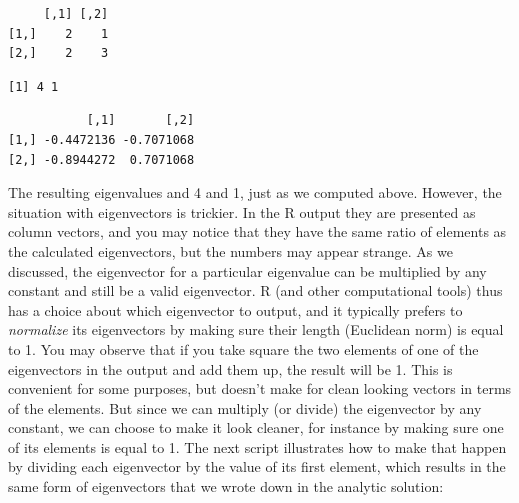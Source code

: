 \documentclass[
  letterpaper,
  DIV=11,
  numbers=noendperiod]{scrreprt}
\newenvironment{Shaded}{\begin{snugshade}}{\end{snugshade}}
\newcommand{\FunctionTok}[1]{\textcolor[rgb]{0.28,0.35,0.67}{#1}}
\newcommand{\NormalTok}[1]{\textcolor[rgb]{0.00,0.23,0.31}{#1}}
\newcommand{\OtherTok}[1]{\textcolor[rgb]{0.00,0.23,0.31}{#1}}
\newcommand{\SpecialCharTok}[1]{\textcolor[rgb]{0.37,0.37,0.37}{#1}}
\begin{document}
\begin{verbatim}
     [,1] [,2]
[1,]    2    1
[2,]    2    3
\end{verbatim}

\begin{Shaded}
\end{Shaded}

\begin{verbatim}
[1] 4 1
\end{verbatim}

\begin{Shaded}
\end{Shaded}

\begin{verbatim}
           [,1]       [,2]
[1,] -0.4472136 -0.7071068
[2,] -0.8944272  0.7071068
\end{verbatim}

The resulting eigenvalues and 4 and 1, just as we computed above.
However, the situation with eigenvectors is trickier. In the R output
they are presented as column vectors, and you may notice that they have
the same ratio of elements as the calculated eigenvectors, but the
numbers may appear strange. As we discussed, the eigenvector for a
particular eigenvalue can be multiplied by any constant and still be a
valid eigenvector. R (and other computational tools) thus has a choice
about which eigenvector to output, and it typically prefers to
\emph{normalize} its eigenvectors by making sure their length (Euclidean
norm) is equal to 1. You may observe that if you take square the two
elements of one of the eigenvectors in the output and add them up, the
result will be 1. This is convenient for some purposes, but doesn't make
for clean looking vectors in terms of the elements. But since we can
multiply (or divide) the eigenvector by any constant, we can choose to
make it look cleaner, for instance by making sure one of its elements is
equal to 1. The next script illustrates how to make that happen by
dividing each eigenvector by the value of its first element, which
results in the same form of eigenvectors that we wrote down in the
analytic solution:
\end{document}
